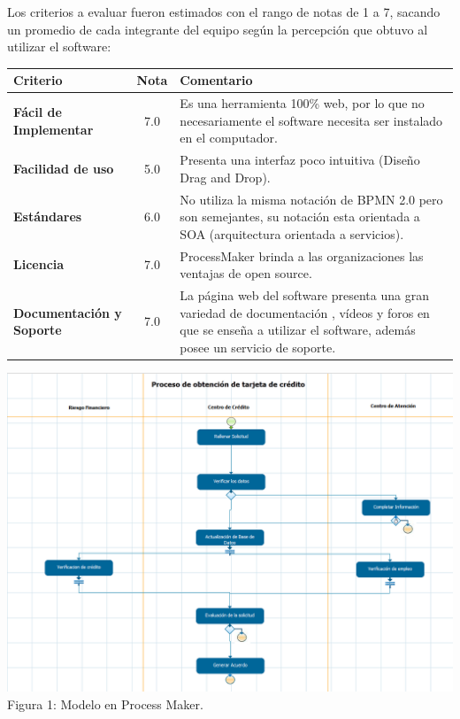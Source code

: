 Los criterios a evaluar fueron estimados con el rango de notas de 1 a 7, sacando un promedio de cada integrante del equipo según la percepción que obtuvo al utilizar el software: \\

\begin{center}
\begin{tabular}{|l|c|p{2.40in}|}
 \hline
 \textbf{Criterio} & \textbf{Nota} & \textbf{Comentario} \\
 \hline
 \textbf{Fácil de Implementar} & 7.0 & Es una herramienta 100\% web, por lo que no necesariamente el software necesita ser instalado en el computador. \\
 \hline
 \textbf{Facilidad de uso} & 5.0 & Presenta una interfaz poco intuitiva (Diseño Drag and Drop). \\
 \hline
 \textbf{Estándares} & 6.0 & No utiliza la misma notación de BPMN 2.0 pero son semejantes, su notación esta orientada a SOA (arquitectura orientada a servicios). \\
 \hline
 \textbf{Licencia} & 7.0 & ProcessMaker brinda a las organizaciones las ventajas de open source. \\
 \hline
 \textbf{Documentación y Soporte} & 7.0 & La página web del software presenta una gran variedad de documentación , vídeos y foros en que se enseña a utilizar el software, además posee un servicio de soporte. \\
 \hline
\end{tabular}
\end{center}

\begin{center}
\includegraphics[scale=0.5]{./imagenes/modelos_pm.png}\\
     Figura 1: Modelo en Process Maker.\\
\end{center}